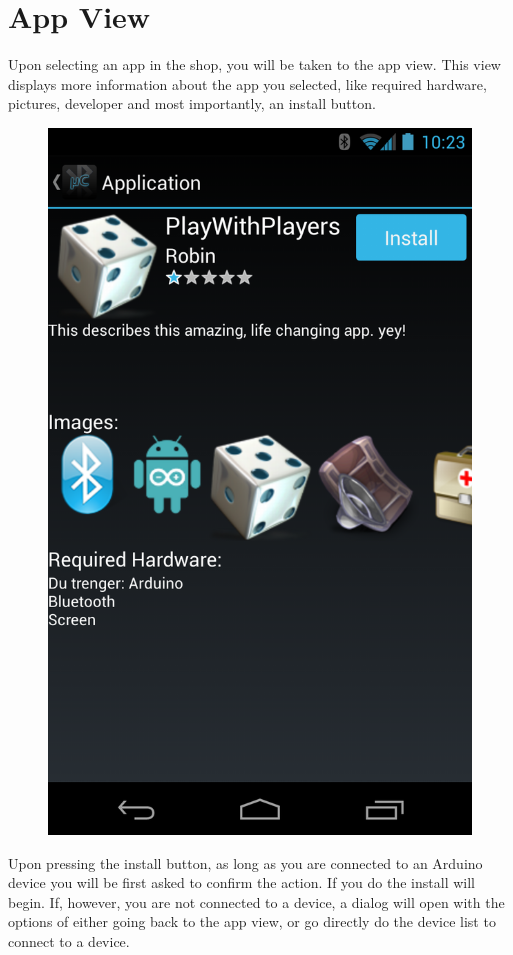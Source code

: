\chapter{App View}
Upon selecting an app in the shop, you will be taken to the app view. This view displays more information about the app you selected, like required hardware, pictures, developer and most importantly, an install button. 
\newline
\begin{figure}[H]
	\centering
	\includegraphics[scale = 0.3]{images/Screenshots/app_view.png}
\end{figure}
Upon pressing the install button, as long as you are connected to an Arduino device you will be first asked to confirm the action. If you do the install will begin. If, however, you are not connected to a device, a dialog will open with the options of either going back to the app view, or go directly do the device list to connect to a device.

